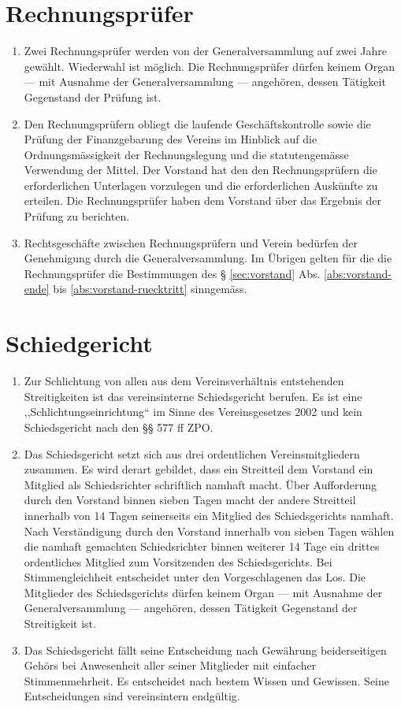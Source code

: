 \documentclass[a4paper,12pt]{article}
\newcommand{\funktionsperiode}{zwei Jahre }
\begin{document}
	\section{Rechnungsprüfer}
		\label{sec:rechnungspruefer}
		\begin{enumerate}
			\item Zwei Rechnungsprüfer werden von der Generalversammlung auf \funktionsperiode gewählt. Wiederwahl ist möglich. Die Rechnungsprüfer dürfen keinem Organ --- mit Ausnahme der Generalversammlung --- angehören, dessen Tätigkeit Gegenstand der Prüfung ist.
			\item Den Rechnungsprüfern obliegt die laufende Geschäftskontrolle sowie die Prüfung der Finanzgebarung des Vereins im Hinblick auf die Ordnungsmässigkeit der Rechnungslegung und die statutengemässe Verwendung der Mittel. Der Vorstand hat den den Rechnungsprüfern die erforderlichen Unterlagen vorzulegen und die erforderlichen Auskünfte zu erteilen. Die Rechnungsprüfer haben dem Vorstand über das Ergebnis der Prüfung zu berichten.
			\label{abs:rechnungspruefer-kontrolle}
			\item Rechtsgeschäfte zwischen Rechnungsprüfern und Verein bedürfen der Genehmigung durch die Generalversammlung. Im Übrigen gelten für die die Rechnungsprüfer die Bestimmungen des § \ref{sec:vorstand} Abs. \ref{abs:vorstand-ende} bis \ref{abs:vorstand-ruecktritt} sinngemäss.
		\end{enumerate}

	\section{Schiedgericht}
		\label{sec:schiedsgericht}
		\begin{enumerate}
			\item Zur Schlichtung von allen aus dem Vereinsverhältnis entstehenden Streitigkeiten ist das vereinsinterne Schiedsgericht berufen. Es ist eine ,,Schlichtungseinrichtung`` im Sinne des Vereinsgesetzes 2002 und kein Schiedsgericht nach den §§ 577 ff ZPO.
			\item Das Schiedsgericht setzt sich aus drei ordentlichen Vereinsmitgliedern zusammen. Es wird derart gebildet, dass ein Streitteil dem Vorstand ein Mitglied als Schiedsrichter schriftlich namhaft macht. Über Aufforderung durch den Vorstand binnen sieben Tagen macht der andere Streitteil innerhalb von 14 Tagen seinerseits ein Mitglied des Schiedsgerichts namhaft. Nach Verständigung durch den Vorstand innerhalb von sieben Tagen wählen die namhaft gemachten Schiedsrichter binnen weiterer 14 Tage ein drittes ordentliches Mitglied zum Vorsitzenden des Schiedsgerichts. Bei Stimmengleichheit entscheidet unter den Vorgeschlagenen das Los. Die Mitglieder des Schiedsgerichts dürfen keinem Organ --- mit Ausnahme der Generalversammlung --- angehören, dessen Tätigkeit Gegenstand der Streitigkeit ist.
			\item Das Schiedsgericht fällt seine Entscheidung nach Gewährung beiderseitigen Gehörs bei Anwesenheit aller seiner Mitglieder mit einfacher Stimmenmehrheit. Es entscheidet nach bestem Wissen und Gewissen. Seine Entscheidungen sind vereinsintern endgültig.
		\end{enumerate}
\end{document}
